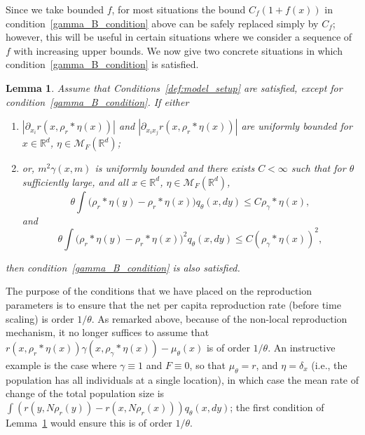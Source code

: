 \documentclass[12pt]{article}
\newtheorem{lemma}[theorem]{Lemma}
\newcommand{\IR}{\mathbb R}
\newcommand{\kernel}{\rho}  %
\newcommand{\smooth}[1]{\kernel_{#1} \! * \!}  %
\newcommand{\measures}{\mathcal{M}_F(\IR^d)} %
\numberwithin{equation}{section}
\begin{document}
Since we take bounded $f$,
for most situations the bound $C_f(1+f(x))$ in condition~\ref{gamma_B_condition} above
can be safely replaced simply by $C_f$;
however, this will be useful
in certain situations where we consider a sequence of $f$ with increasing upper bounds.
We now give two concrete situations in which condition~\ref{gamma_B_condition} is satisfied.

\begin{lemma}
    \label{lem:conditions on r}
    Assume that Conditions~\ref{def:model_setup} are satisfied,
    except for condition~\ref{gamma_B_condition}.
    If either
\begin{enumerate}
\item
\label{control through r} 
    $|\partial_{x_i}r(x,\smooth{r}\eta(x))|$ and 
    $|\partial_{x_ix_j}r(x,\smooth{r}\eta(x))|$
    are uniformly bounded for $x\in\IR^d$, $\eta\in\measures$;
\item 
\label{control through gamma}
    or, $m^2\gamma(x,m)$ is uniformly bounded and there exists $C<\infty$
    such that for $\theta$ sufficiently large, and all $x\in\IR^d$, $\eta\in\measures$,
    \[
    \theta\int\big(\smooth{r}\eta(y)-\smooth{r}\eta(x)\big)q_\theta(x,dy)\leq C\smooth{\gamma}\eta(x),
    \]
    and
    \[\theta\int\big(\smooth{r}\eta(y)-\smooth{r}\eta(x)\big)^2q_\theta(x,dy)
    \leq C(\smooth{\gamma}\eta(x))^2 ,
    \]
\end{enumerate} 
    then condition~\ref{gamma_B_condition} is also satisfied.
\end{lemma}

The purpose of the conditions that we have placed on the reproduction parameters is to 
ensure that the net per capita reproduction rate (before time scaling)
is order $1/\theta$. As remarked above, 
because of the non-local reproduction mechanism, it no longer suffices to assume that 
$r(x,\smooth{r}\eta(x))\gamma(x, \smooth{\gamma}\eta(x))-\mu_\theta(x)$ is of order $1/\theta$.
An instructive example is the case where $\gamma \equiv 1$ and $F \equiv 0$, so that $\mu_\theta = r$,
and $\eta = \delta_x$
(i.e., the population has all individuals at a single location),
in which case the mean rate of change of the total population size
is $\int (r(y, N \rho_r(y) ) - r(x, N \rho_r(x))) q_\theta(x, dy)$;
the first condition of Lemma~\ref{lem:conditions on r} would ensure this is of order $1/\theta$.
\end{document}
